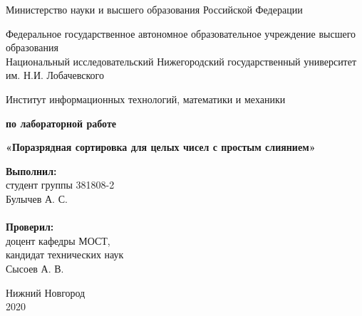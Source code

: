 \documentclass{report}
\begin{document}
\begin{titlepage}

\begin{center}
Министерство науки и высшего образования Российской Федерации
\end{center}

\begin{center}
Федеральное государственное автономное образовательное учреждение высшего образования \\
Национальный исследовательский Нижегородский государственный университет им. Н.И. Лобачевского
\end{center}

\begin{center}
Институт информационных технологий, математики и механики
\end{center}

\vspace{4em}

\begin{center}
\textbf{ по лабораторной работе} \\
\end{center}
\begin{center}
\textbf{\Large«Поразрядная сортировка для целых чисел с простым слиянием»} \\
\end{center}

\vspace{4em}

\newbox{\lbox}
\newlength{\maxl}
\setlength{\maxl}{\wd\lbox}
\hfill\parbox{7cm}{
\hspace*{5cm}\hspace*{-5cm}\textbf{Выполнил:} \\ студент группы 381808-2 \\ Булычев А. С.\\
\\
\hspace*{5cm}\hspace*{-5cm}\textbf{Проверил:}\\ доцент кафедры МОСТ, \\ кандидат технических наук \\ Сысоев А. В.\\}
\vspace{\fill}

\begin{center} Нижний Новгород \\ 2020 \end{center}

\end{titlepage}
\end{document}
